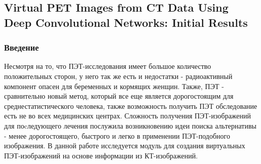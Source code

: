 \subsection*{Virtual PET Images from CT Data Using Deep
Convolutional Networks: Initial Results}

\subsubsection*{Введение}
Несмотря на то, что ПЭТ-исследования имеет большое количество положительных 
сторон, у него так же есть и недостатки - радиоактивный компонент опасен 
для беременных и кормящих женщин. Также, ПЭТ - сравнительно новый метод, который все 
еще является дорогостоящим для среднестатистического человека, также возможность получить 
ПЭТ обследование есть не во всех медицинских центрах. Сложность получения ПЭТ-изображений для 
поcледующего лечения послужила возникновению идеи поиска альтернативы - менее дорогостоящего, быстрого 
и легко в применении ПЭТ-подобного изображения. В данной работе \cite{ann10} исследуется 
модуль для создания виртуальных ПЭТ-изображений на основе информации из КТ-изображений.
